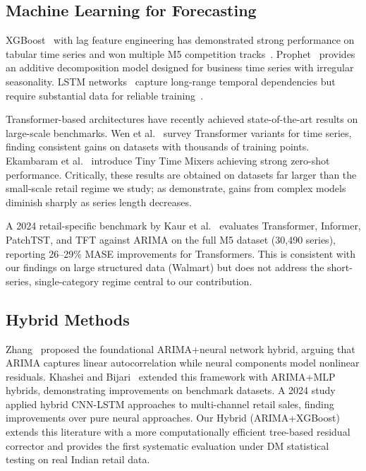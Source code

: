 \documentclass[journal]{IEEEtran}
\begin{document}
\subsection{Machine Learning for Forecasting}

XGBoost~\cite{chen2016xgboost} with lag feature engineering has demonstrated strong performance on tabular time series and won multiple M5 competition tracks~\cite{makridakis2022m5}. Prophet~\cite{taylor2018forecasting} provides an additive decomposition model designed for business time series with irregular seasonality. LSTM networks~\cite{hochreiter1997long} capture long-range temporal dependencies but require substantial data for reliable training~\cite{benidis2022deep}.

Transformer-based architectures have recently achieved state-of-the-art results on large-scale benchmarks. Wen et al.~\cite{wen2023transformers} survey Transformer variants for time series, finding consistent gains on datasets with thousands of training points. Ekambaram et al.~\cite{ekambaram2024ttm} introduce Tiny Time Mixers achieving strong zero-shot performance. Critically, these results are obtained on datasets far larger than the small-scale retail regime we study; as \cite{makridakis2018statistical} demonstrate, gains from complex models diminish sharply as series length decreases.

A 2024 retail-specific benchmark by Kaur et al.~\cite{kaur2024transformer} evaluates Transformer, Informer, PatchTST, and TFT against ARIMA on the full M5 dataset (30,490 series), reporting 26–29\% MASE improvements for Transformers. This is consistent with our findings on large structured data (Walmart) but does not address the short-series, single-category regime central to our contribution.

\subsection{Hybrid Methods}

Zhang~\cite{zhang2003time} proposed the foundational ARIMA+neural network hybrid, arguing that ARIMA captures linear autocorrelation while neural components model nonlinear residuals. Khashei and Bijari~\cite{khashei2010novel} extended this framework with ARIMA+MLP hybrids, demonstrating improvements on benchmark datasets. A 2024 study~\cite{moraes2024hybrid} applied hybrid CNN-LSTM approaches to multi-channel retail sales, finding improvements over pure neural approaches. Our Hybrid (ARIMA+XGBoost) extends this literature with a more computationally efficient tree-based residual corrector and provides the first systematic evaluation under DM statistical testing on real Indian retail data.
\end{document}
